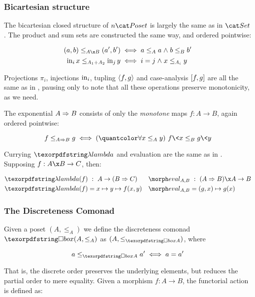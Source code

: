 

\subsubsection{Bicartesian structure}

The bicartesian closed structure of $n\Poset$ is largely the same as in $\Set$.
%
The product and sum sets are constructed the same way, and ordered pointwise:

\begin{align*}
  (a,b) \le_{A \x B} (a',b') &\iff a \le_A a \wedge b \le_B b'\\
  \inj i x \le_{A_1 + A_2} \inj j y &\iff i = j \wedge x \le_{A_i} y
\end{align*}

\noindent Projections $\pi_i$, injections $\mathrm{in}_i$, tupling $\langle{f,g}\rangle$ and
case-analysis $[{f,g}]$ are all the same as in \Set, pausing only to note
that all these operations preserve monotonicity, as we need.

The exponential $A \Rightarrow B$ consists of only the \emph{monotone} maps $f : A \to
B$, again ordered pointwise:

\[ f \le_{\expO A B} g \iff \fa{x \le_A y} f\<x \le_B g\<y \]

\noindent
Currying $\fn$ and evaluation are the same as in \Set. Supposing $f : A \x B \to
C$, then:

\begin{align*}
  \fn(f) &\isa A \to (\expO B C) &
  \eval_{A,B} &\isa (\expO A B) \x A \to B
  \\
  \fn(f) &= x \mapsto y \mapsto f(x,y) &
  \eval_{A,B} &= (g,x) \mapsto g(x)
\end{align*}


\subsubsection{The Discreteness Comonad}

Given a poset $(A, \leq_A)$ we define the discreteness comonad $\iso(A, \leq_A)$
as $(A, \leq_{\iso A})$, where

\begin{displaymath}
  a \leq_{\iso A} a' \iff a = a'
\end{displaymath}

\noindent
That is, the discrete order preserves the underlying elements, but reduces the
partial order to mere equality. Given a morphism $f : A \to B$, the functorial
action is defined as:

